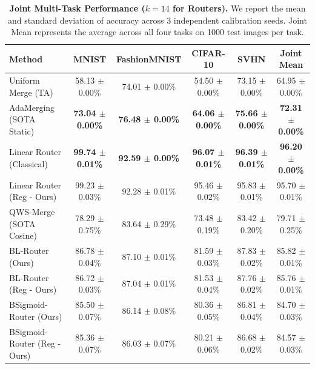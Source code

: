 \begin{table}[t]
\caption{\textbf{Joint Multi-Task Performance ($k=14$ for Routers).} We report the mean and standard deviation of accuracy across 3 independent calibration seeds. Joint Mean represents the average across all four tasks on 1000 test images per task.}
\label{tab:homogeneous}
\vskip 0.15in
\begin{center}
\begin{small}
\setlength{\tabcolsep}{4.5pt}
\begin{tabular}{lccccc}
\toprule
Method & MNIST & FashionMNIST & CIFAR-10 & SVHN & Joint Mean \\
\midrule
Uniform Merge (TA) & 58.13 $\pm$ 0.00\% & 74.01 $\pm$ 0.00\% & 54.50 $\pm$ 0.00\% & 73.15 $\pm$ 0.00\% & 64.95 $\pm$ 0.00\% \\
AdaMerging (SOTA Static) & \textbf{73.04 $\pm$ 0.00\%} & \textbf{76.48 $\pm$ 0.00\%} & \textbf{64.06 $\pm$ 0.00\%} & \textbf{75.66 $\pm$ 0.00\%} & \textbf{72.31 $\pm$ 0.00\%} \\
\midrule
Linear Router (Classical) & \textbf{99.74 $\pm$ 0.01\%} & \textbf{92.59 $\pm$ 0.00\%} & \textbf{96.07 $\pm$ 0.01\%} & \textbf{96.39 $\pm$ 0.01\%} & \textbf{96.20 $\pm$ 0.00\%} \\
Linear Router (Reg - Ours) & 99.23 $\pm$ 0.03\% & 92.28 $\pm$ 0.01\% & 95.46 $\pm$ 0.02\% & 95.83 $\pm$ 0.01\% & 95.70 $\pm$ 0.01\% \\
QWS-Merge (SOTA Cosine) & 78.29 $\pm$ 0.75\% & 83.64 $\pm$ 0.29\% & 73.48 $\pm$ 0.19\% & 83.42 $\pm$ 0.20\% & 79.71 $\pm$ 0.25\% \\
\midrule
BL-Router (Ours) & 86.78 $\pm$ 0.04\% & 87.10 $\pm$ 0.01\% & 81.59 $\pm$ 0.03\% & 87.83 $\pm$ 0.02\% & 85.82 $\pm$ 0.01\% \\
BL-Router (Reg - Ours) & 86.72 $\pm$ 0.03\% & 87.04 $\pm$ 0.01\% & 81.53 $\pm$ 0.04\% & 87.76 $\pm$ 0.02\% & 85.76 $\pm$ 0.01\% \\
BSigmoid-Router (Ours) & 85.50 $\pm$ 0.07\% & 86.14 $\pm$ 0.08\% & 80.36 $\pm$ 0.05\% & 86.81 $\pm$ 0.04\% & 84.70 $\pm$ 0.03\% \\
BSigmoid-Router (Reg - Ours) & 85.36 $\pm$ 0.07\% & 86.03 $\pm$ 0.07\% & 80.21 $\pm$ 0.06\% & 86.68 $\pm$ 0.02\% & 84.57 $\pm$ 0.03\% \\
\bottomrule
\end{tabular}
\end{small}
\end{center}
\vskip -0.1in
\end{table}


